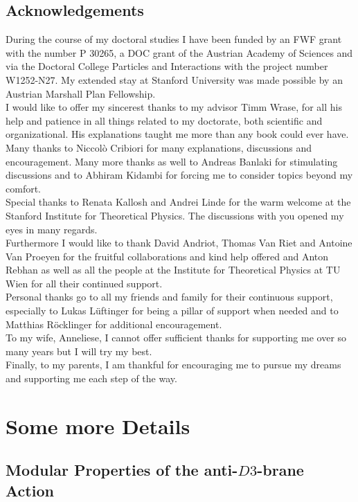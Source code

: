 \documentclass[a4paper,12pt]{report}
\begin{document}
\newpage
\section*{Acknowledgements}
During the course of my doctoral studies I have been funded by an FWF grant with the number P 30265, a DOC grant of the Austrian Academy of Sciences and via the Doctoral College Particles  and Interactions with the project number W1252-N27. My extended stay at Stanford University was made possible by an Austrian Marshall Plan Fellowship.\\
I would like to offer my sincerest thanks to my advisor Timm Wrase, for all his help and patience in all things related to my doctorate, both scientific and organizational. His explanations taught me more than any book could ever have.\\
Many thanks to Niccol\`o Cribiori for many explanations, discussions and encouragement. Many more thanks as well to Andreas Banlaki for stimulating discussions and to Abhiram Kidambi for forcing me to consider topics beyond my comfort.\\
Special thanks to Renata Kallosh and Andrei Linde for the warm welcome at the Stanford Institute for Theoretical Physics. The discussions with you opened my eyes in many regards.\\
Furthermore I would like to thank David Andriot, Thomas Van Riet and Antoine Van Proeyen for the fruitful collaborations and kind help offered and Anton Rebhan as well as all the people at the Institute  for Theoretical Physics at TU Wien for all their continued support.\\
Personal thanks go to all my friends and family for their continuous support, especially to Lukas Lüftinger for being a pillar of support when needed and to Matthias Röcklinger for additional encouragement.\\
To my wife, Anneliese, I cannot offer sufficient thanks for supporting me over so many years but I will try my best.\\
Finally, to my parents, I am thankful for encouraging me to pursue my dreams and supporting me each step of the way.


\appendix
\chapter{Some more Details}

\section{Modular Properties of the anti-$D3$-brane Action}
\label{app:modinv}
\end{document}

